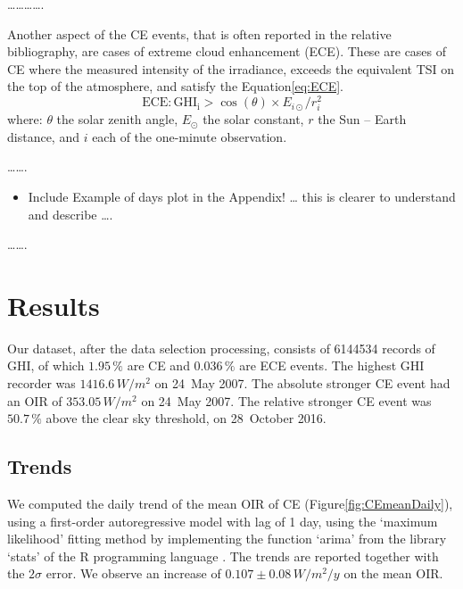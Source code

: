 \documentclass[preprint, 3p,
authoryear]{elsarticle} %
\providecommand{\tightlist}{%
  \setlength{\itemsep}{0pt}\setlength{\parskip}{0pt}}
\begin{document}
\ldots\ldots\ldots\ldots.

Another aspect of the CE events, that is often reported in the relative
bibliography, are cases of extreme cloud enhancement (ECE). These are
cases of CE where the measured intensity of the irradiance, exceeds the
equivalent TSI on the top of the atmosphere, and satisfy the
Equation\nobreakspace{}\ref{eq:ECE}. \begin{equation}
\text{ECE}: \text{GHI}_\text{i} > \cos(\theta) \times E_{i\odot} / r_{i}^2
\label{eq:ECE}
\end{equation} where: \(\theta\) the solar zenith angle, \(E_{\odot}\)
the solar constant, \(r\) the Sun -- Earth distance, and \(i\) each of
the one-minute observation.

\ldots\ldots.

\begin{itemize}
\tightlist
\item
  Include Example of days plot in the Appendix! \ldots{} this is clearer
  to understand and describe \ldots.
\end{itemize}

\ldots\ldots.

\hypertarget{results}{%
\section{Results}\label{results}}

Our dataset, after the data selection processing, consists of 6144534
records of GHI, of which \(1.95\,\%\) are CE and \(0.036\,\%\) are ECE
events. The highest GHI recorder was \(1416.6\,W/m^2\) on 24~May 2007.
The absolute stronger CE event had an OIR of \(353.05\,W/m^2\) on 24~May
2007. The relative stronger CE event was \(50.7\,\%\) above the clear
sky threshold, on 28~October 2016.

\hypertarget{trends}{%
\subsection{Trends}\label{trends}}

We computed the daily trend of the mean OIR of CE
(Figure\nobreakspace{}\ref{fig:CEmeanDaily}), using a first-order
autoregressive model with lag of 1 day, using the `maximum likelihood'
fitting method \citep{Gardner1980, Jones1980} by implementing the
function `arima' from the library `stats' of the R programming language
\citep{RCT2023}. The trends are reported together with the \(2\sigma\)
error. We observe an increase of \(0.107\pm 0.08\,W/m^2/y\) on the mean
OIR.
\end{document}

